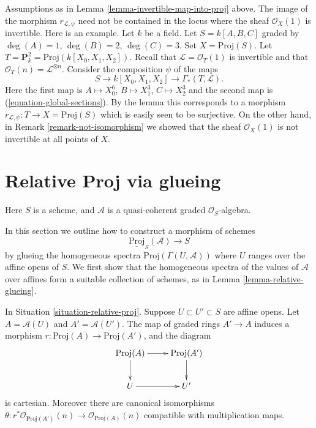 \begin{remark}
\label{remark-not-in-invertible-locus}
Assumptions as in Lemma \ref{lemma-invertible-map-into-proj} above.
The image of the morphism $r_{\mathcal{L}, \psi}$ need not be
contained in the locus where the sheaf $\mathcal{O}_X(1)$
is invertible.
Here is an example.
Let $k$ be a field.
Let $S = k[A, B, C]$ graded by $\deg(A) = 1$, $\deg(B) = 2$, $\deg(C) = 3$.
Set $X = \text{Proj}(S)$.
Let $T = \mathbf{P}^2_k = \text{Proj}(k[X_0, X_1, X_2])$.
Recall that $\mathcal{L} = \mathcal{O}_T(1)$ is invertible
and that $\mathcal{O}_T(n) = \mathcal{L}^{\otimes n}$.
Consider the composition $\psi$ of the maps
$$
S \to k[X_0, X_1, X_2] \to \Gamma_*(T, \mathcal{L}).
$$
Here the first map is $A \mapsto X_0^6$, $B \mapsto X_1^3$,
$C \mapsto X_2^3$ and the second map is (\ref{equation-global-sections}).
By the lemma this corresponds to a morphism
$r_{\mathcal{L}, \psi} : T \to X = \text{Proj}(S)$
which is easily seen to be surjective. On the other hand, in
Remark \ref{remark-not-isomorphism} we showed that the sheaf
$\mathcal{O}_X(1)$ is not invertible at all points of $X$.
\end{remark}










\section{Relative Proj via glueing}
\label{section-relative-proj-via-glueing}

\begin{situation}
\label{situation-relative-proj}
Here $S$ is a scheme, and $\mathcal{A}$
is a quasi-coherent graded $\mathcal{O}_S$-algebra.
\end{situation}

\noindent
In this section we outline how to construct a morphism
of schemes
$$
\underline{\text{Proj}}_S(\mathcal{A}) \longrightarrow S
$$
by glueing the homogeneous spectra $\text{Proj}(\Gamma(U, \mathcal{A}))$
where $U$ ranges over the affine opens of $S$. We first show that the
homogeneous spectra of the values of $\mathcal{A}$ over affines form a
suitable collection of schemes, as in Lemma \ref{lemma-relative-glueing}.

\begin{lemma}
\label{lemma-proj-inclusion}
In Situation \ref{situation-relative-proj}.
Suppose $U \subset U' \subset S$ are affine opens.
Let $A = \mathcal{A}(U)$ and $A' = \mathcal{A}(U')$.
The map of graded rings $A' \to A$ induces a morphism
$r : \text{Proj}(A) \to \text{Proj}(A')$, and the diagram
$$
\xymatrix{
\text{Proj}(A) \ar[r] \ar[d] &
\text{Proj}(A') \ar[d] \\
U \ar[r] &
U'
}
$$
is cartesian. Moreover there are canonical isomorphisms
$\theta : r^*\mathcal{O}_{\text{Proj}(A')}(n) \to
\mathcal{O}_{\text{Proj}(A)}(n)$ compatible with multiplication maps.
\end{lemma}

